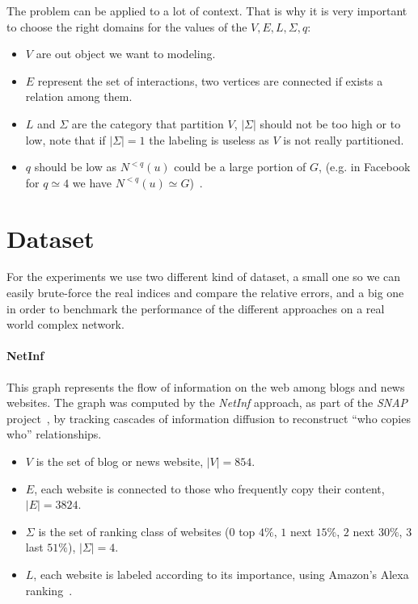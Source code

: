     The problem can be applied to a lot of context.
    That is why it is very important to choose the right domains for the values of the $V, E, L, \Sigma, q$:
    \begin{itemize}
	    \item $V$ are out object we want to modeling.
	    \item $E$ represent the set of interactions, two vertices are connected if exists a relation among them.
	    \item $L$ and $\Sigma$ are the category that partition $V$, $|\Sigma|$ should not be too high or to low, note that if $|\Sigma| = 1$ the labeling is useless as $V$ is not really partitioned.
	    \item $q$ should be low as $N^{<q}(u)$ could be a large portion of $G$, (e.g. in Facebook for $q \simeq 4$ we have $N^{<q}(u) \simeq G$)~\cite{Facebook}.
    \end{itemize}
    
    
    \section{Dataset}
    
    For the experiments we use two different kind of dataset, a small one so we can easily brute-force the real indices and compare the relative errors, and a big one in order to benchmark the performance of the different approaches on a real world complex network.
    
    \paragraph*{NetInf} This graph represents the flow of information on the web among blogs and news websites. The graph was computed by the \textit{NetInf} approach, as part of the \textit{SNAP} project~\cite{netinf}, by tracking cascades of information diffusion to reconstruct ``who copies who'' relationships.
    
    \begin{itemize}
    	\item $V$ is the set of blog or news website, $|V| = 854$.
    	\item $E$, each website is connected to those who frequently copy their content, $|E| = 3824$.
    	\item $\Sigma$ is the set of ranking class of websites ($0$ top $4\%$, $1$ next $15\%$, $2$ next $30\%$, $3$ last $51\%$), $|\Sigma| = 4$.
    	\item $L$, each website is labeled according to its importance, using Amazon's Alexa ranking~\cite{alexarank}.
    \end{itemize}

